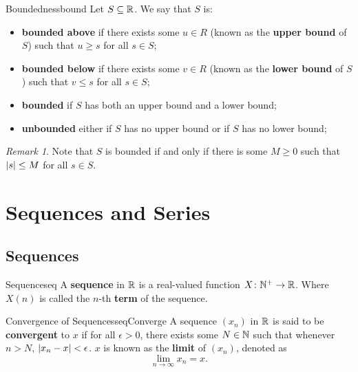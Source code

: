\documentclass[math]{amznotes}
\theoremstyle{remark}
\newtheorem*{remark}{Remark}
\begin{document}
\begin{dfnbox}{Boundedness}{bound}
    Let $S \subseteq \mathbb{R}$. We say that $S$ is:
    \begin{itemize}
        \item {\color{red} \textbf{bounded above}} if there exists some $u \in R$ (known as the {\color{red} \textbf{upper bound}} of $S$) such that $u \geq s$ for all $s \in S$; 
        \item {\color{red} \textbf{bounded below}} if there exists some $v \in R$ (known as the {\color{red} \textbf{lower bound}} of $S$) such that $v \leq s$ for all $s \in S$; 
        \item {\color{red} \textbf{bounded}} if $S$ has both an upper bound and a lower bound;
        \item {\color{red} \textbf{unbounded}} either if $S$ has no upper bound or if $S$ has no lower bound;     
    \end{itemize}
\end{dfnbox}
\begin{notebox}
    \begin{remark}
        Note that $S$ is bounded if and only if there is some $M \geq 0$ such that ${\left\lvert {s} \right\rvert} \leq M$ for all $s \in S$.
    \end{remark}
\end{notebox}

\chapter{Sequences and Series}
\section{Sequences}
\begin{dfnbox}{Sequence}{seq}
    A {\color{red} \textbf{sequence}} in $\mathbb{R}$ is a real-valued function $X \colon \mathbb{N}^+ \to \mathbb{R}$. Where $X(n)$ is called the $n$-th {\color{red} \textbf{term}} of the sequence.
\end{dfnbox}
\begin{dfnbox}{Convergence of Sequences}{seqConverge}
    A sequence $(x_n)$ in $\mathbb{R}$ is said to be {\color{red} \textbf{convergent}} to $x$ if for all $\epsilon > 0$, there exists some $N \in \mathbb{N}$ such that whenever $n > N$, ${\left\lvert {x_n - x} \right\rvert} < \epsilon$. $x$ is known as the {\color{red} \textbf{limit}} of $(x_n)$, denoted as
    \begin{equation*}
        \lim_{n \to \infty}x_n = x.
    \end{equation*}
\end{dfnbox}
\end{document}
